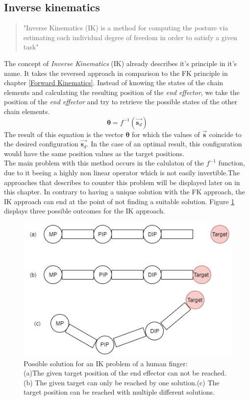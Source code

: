  \subsection{Inverse kinematics}
 \label{inverse kinematics}
\begin{quote}"Inverse Kinematics (IK) is a method for computing the posture via estimating each individual degree of freedom in order to satisfy a given task" \cite{AndreasAristidouandJoanLasenby.2009}\end{quote}
The concept of \textit{Inverse Kinematics}  (IK) already describes it's principle in it's name. It takes the reversed approach in comparison to the FK principle in chapter \ref{Forward Kinematics}. Instead of knowing the states of the chain elements and calculating the resulting position of the \textit{end effector}, we take the position of the \textit{end effector} and try to retrieve the possible states of the other chain elements. 
\begin{equation}
\label{ik problem formula}
\pmb{\theta}=f^{-1}(\vec{\textbf{s}_{d}})
\end{equation}
The result of this equation is the vector $\pmb{\theta}$ for which the values of $\vec{\textbf{s}}$ coincide to the desired configuration $\vec{\textbf{s}_{d}}$. In the case of an optimal result, this configuration would have the same position values as the target positions.\\ The main problem with this method occurs in the calulaton of the $f^{-1}$ function, due to it beeing a highly non linear operator which is not easily invertible.The approaches that \cite{AndreasAristidouandJoanLasenby.2009} describes to counter this problem will be displayed later on in this chapter.
In contrary to having a unique solution with the FK approach, the IK approach can end at the point of not finding a suitable solution. Figure \ref{IkSolutions} displays three possible outcomes for the IK approach.
\begin{figure}[H]
\includegraphics[scale=0.6]{images/Ik_figure.jpg}
\caption{Possible solution for an IK problem of a human finger:\\(a)The given target position of the end effector can not be reached. (b) The given target can only be reached by one solution.(c) The target position can be reached with multiple different solutions.}
\label{IkSolutions}
\end{figure}

